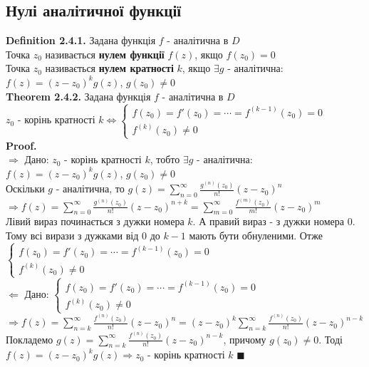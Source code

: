 \documentclass[a4paper, 14pt]{extarticle}
\def\hugespace{\vspace{5mm} \\}
\begin{document}
	\subsection{Нулі аналітичної функції}
	\textbf{Definition 2.4.1.} Задана функція $f$ - аналітична в $D$\\
	Точка $z_0$ називається \textbf{нулем функції} $f(z)$, якщо $f(z_0) = 0$\\
	Точка $z_0$ називається \textbf{нулем кратності} $k$, якщо $\exists g$ - аналітична:\\ $f(z)=(z-z_0)^k g(z)$, $g(z_0) \neq 0$
	\hugespace
	\textbf{Theorem 2.4.2.} Задана функція $f$ - аналітична в $D$\\
	$z_0$ - корінь кратності $k \iff \begin{cases} 
	f(z_0)=f'(z_0)=\cdots=f^{(k-1)}(z_0) = 0\\
	f^{(k)}(z_0) \neq 0
	\end{cases}$\\
	\textbf{Proof.}\\
	$\boxed{\Rightarrow}$ Дано: $z_0$ - корінь кратності $k$, тобто $\exists g$ - аналітична:\\ $f(z)=(z-z_0)^k g(z)$, $g(z_0) \neq 0$\\
	Оскільки $g$ - аналітична, то $\displaystyle g(z) = \sum_{n=0}^{\infty} \frac{g^{(n)}(z_0)}{n!} (z-z_0)^n$\\
	$\Rightarrow \displaystyle f(z) = \sum_{n=0}^{\infty} \frac{g^{(n)}(z_0)}{n!} (z-z_0)^{n+k} = \sum_{m=0}^{\infty} \frac{f^{(m)}(z_0)}{m!} (z-z_0)^{m}$\\
	Лівий вираз починається з дужки номера $k$. А правий вираз - з дужки номера $0$. Тому всі вирази з дужками від $0$ до $k-1$ мають бути обнуленими. Отже\\
	$\begin{cases} 
	f(z_0)=f'(z_0)=\cdots=f^{(k-1)}(z_0) = 0\\
	f^{(k)}(z_0) \neq 0
	\end{cases}$
	\hugespace
	$\boxed{\Leftarrow}$ Дано: $\begin{cases} 
	f(z_0)=f'(z_0)=\cdots=f^{(k-1)}(z_0) = 0\\
	f^{(k)}(z_0) \neq 0
	\end{cases}$\\
	$\Rightarrow \displaystyle f(z) = \sum_{n=k}^{\infty} \frac{f^{(n)}(z_0)}{n!} (z-z_0)^{n}= (z-z_0)^{k} \sum_{n=k}^{\infty} \frac{f^{(n)}(z_0)}{n!} (z-z_0)^{n-k}$\\
	Покладемо $\displaystyle g(z) = \sum_{n=k}^{\infty} \frac{f^{(n)}(z_0)}{n!} (z-z_0)^{n-k}$, причому $g(z_0) \neq 0$. Тоді\\
	$f(z)=(z-z_0)^k g(z) \Rightarrow z_0$ - корінь кратності $k$ $\blacksquare$
	\hugespace
	
\end{document}
